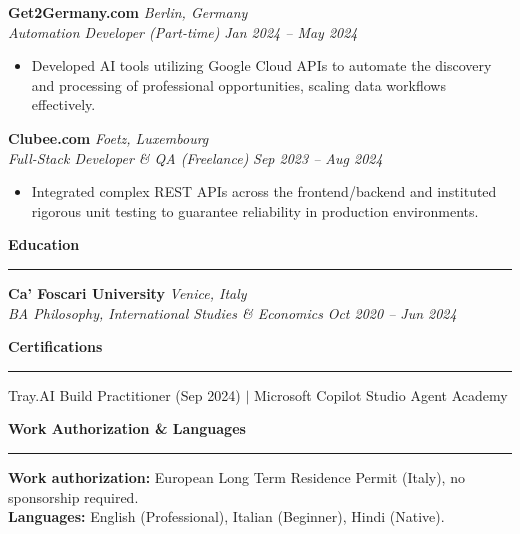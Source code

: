 \documentclass[11pt,a4paper]{article}
\begin{document}
\vspace{0.5em}
\noindent\textbf{Get2Germany.com} \hfill \textit{Berlin, Germany} \\
\textit{Automation Developer (Part-time)} \hfill \textit{Jan 2024 -- May 2024}
\begin{itemize}[leftmargin=*]
\item Developed AI tools utilizing Google Cloud APIs to automate the discovery and processing of professional opportunities, scaling data workflows effectively.
\end{itemize}

\vspace{0.5em}
\noindent\textbf{Clubee.com} \hfill \textit{Foetz, Luxembourg} \\
\textit{Full-Stack Developer \& QA (Freelance)} \hfill \textit{Sep 2023 -- Aug 2024}
\begin{itemize}[leftmargin=*]
\item Integrated complex REST APIs across the frontend/backend and instituted rigorous unit testing to guarantee reliability in production environments.
\end{itemize}

\vspace{1em}
\noindent\textbf{\Large Education} \\
\rule{\textwidth}{0.4pt}
\noindent\textbf{Ca' Foscari University} \hfill \textit{Venice, Italy} \\
\textit{BA Philosophy, International Studies \& Economics} \hfill \textit{Oct 2020 -- Jun 2024}

\vspace{1em}
\noindent\textbf{\Large Certifications} \\
\rule{\textwidth}{0.4pt}
Tray.AI Build Practitioner (Sep 2024) $|$ Microsoft Copilot Studio Agent Academy

\vspace{1em}
\noindent\textbf{\Large Work Authorization \& Languages} \\
\rule{\textwidth}{0.4pt}
\noindent \textbf{Work authorization:} European Long Term Residence Permit (Italy), no sponsorship required.\\
\textbf{Languages:} English (Professional), Italian (Beginner), Hindi (Native).
\end{document}
